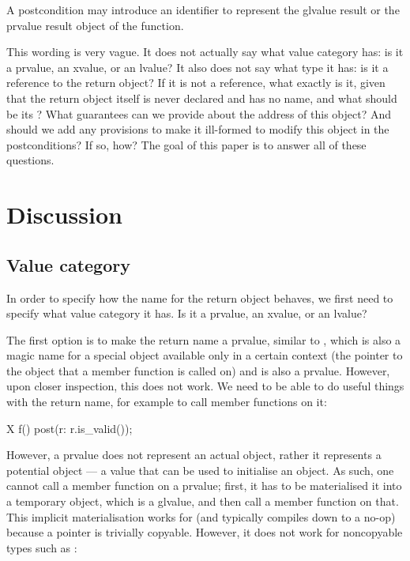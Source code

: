 \begin{adjustwidth}{0.5cm}{0.5cm}
A postcondition may introduce an identifier to represent the glvalue result or the prvalue result object of the function.
\end{adjustwidth}

This wording is very vague. It does not actually say what value category  has: is it a prvalue, an xvalue, or an lvalue? It also does not say what type it has: is it a reference to the return object? If it is not a reference, what exactly is it, given that the return object itself is never declared and has no name, and what should be its ? What guarantees can we provide about the address of this object?
And should we add any provisions to make it ill-formed to modify this object in the postconditions? If so, how?  The goal of this paper is to answer all of these questions.

\section{Discussion}

\subsection{Value category}

In order to specify how the name for the return object behaves, we first need to specify what value category it has. Is it a prvalue, an xvalue, or an lvalue?

\pagebreak %

The first option is to make the return name a prvalue, similar to , which is also a magic name for a special object available only in a certain context (the pointer to the object that a member function is called on) and is also a prvalue. However, upon closer inspection, this does not work. We need to be able to do useful things with the return name, for example to call member functions on it:

\begin{codeblock}
X f()
  post(r: r.is_valid());
\end{codeblock}

However, a prvalue does not represent an actual object, rather it represents a potential object --- a value that can be used to initialise an object. As such, one cannot call a member function on a prvalue; first, it has to be materialised it into a temporary object, which is a glvalue, and then call a member function on that. This implicit materialisation works for  (and typically compiles down to a no-op) because a pointer is trivially copyable. However, it does not work for noncopyable types such as :

